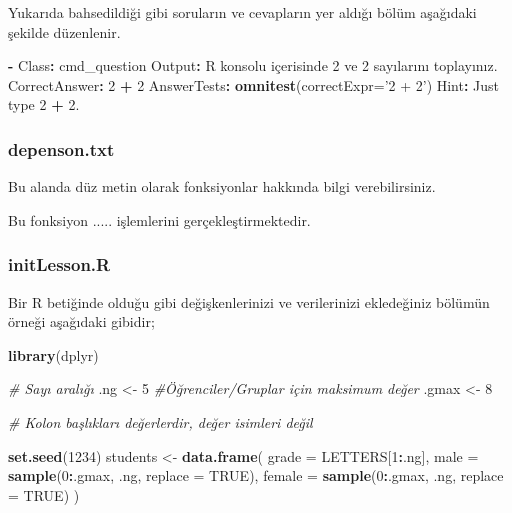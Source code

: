 \documentclass[]{book}
\newenvironment{Shaded}{\begin{snugshade}}{\end{snugshade}}
\newcommand{\KeywordTok}[1]{\textcolor[rgb]{0.13,0.29,0.53}{\textbf{#1}}}
\newcommand{\DataTypeTok}[1]{\textcolor[rgb]{0.13,0.29,0.53}{#1}}
\newcommand{\DecValTok}[1]{\textcolor[rgb]{0.00,0.00,0.81}{#1}}
\newcommand{\StringTok}[1]{\textcolor[rgb]{0.31,0.60,0.02}{#1}}
\newcommand{\CommentTok}[1]{\textcolor[rgb]{0.56,0.35,0.01}{\textit{#1}}}
\newcommand{\OtherTok}[1]{\textcolor[rgb]{0.56,0.35,0.01}{#1}}
\newcommand{\OperatorTok}[1]{\textcolor[rgb]{0.81,0.36,0.00}{\textbf{#1}}}
\newcommand{\NormalTok}[1]{#1}
\begin{document}
Yukarıda bahsedildiği gibi soruların ve cevapların yer aldığı bölüm
aşağıdaki şekilde düzenlenir.

\begin{Shaded}
\begin{Highlighting}[]
\OperatorTok{-}\StringTok{ }\NormalTok{Class}\OperatorTok{:}\StringTok{ }\NormalTok{cmd_question}
\NormalTok{  Output}\OperatorTok{:}\StringTok{ }\NormalTok{R konsolu içerisinde }\DecValTok{2}\NormalTok{ ve }\DecValTok{2}\NormalTok{ sayılarını toplayınız.}
\NormalTok{  CorrectAnswer}\OperatorTok{:}\StringTok{ }\DecValTok{2} \OperatorTok{+}\StringTok{ }\DecValTok{2}
\NormalTok{  AnswerTests}\OperatorTok{:}\StringTok{ }\KeywordTok{omnitest}\NormalTok{(}\DataTypeTok{correctExpr=}\StringTok{'2 + 2'}\NormalTok{)}
\NormalTok{  Hint}\OperatorTok{:}\StringTok{ }\NormalTok{Just type }\DecValTok{2} \OperatorTok{+}\StringTok{ }\DecValTok{2}\NormalTok{.}
\end{Highlighting}
\end{Shaded}

\subsubsection{depenson.txt}\label{depenson.txt}

Bu alanda düz metin olarak fonksiyonlar hakkında bilgi verebilirsiniz.

\begin{Shaded}
\begin{Highlighting}[]
\NormalTok{Bu fonksiyon ..... işlemlerini gerçekleştirmektedir.}
\end{Highlighting}
\end{Shaded}

\subsubsection{initLesson.R}\label{initlesson.r}

Bir R betiğinde olduğu gibi değişkenlerinizi ve verilerinizi ekledeğiniz
bölümün örneği aşağıdaki gibidir;

\begin{Shaded}
\begin{Highlighting}[]
\KeywordTok{library}\NormalTok{(dplyr)}

\CommentTok{# Sayı aralığı}
\NormalTok{.ng <-}\StringTok{ }\DecValTok{5}
\CommentTok{#Öğrenciler/Gruplar için maksimum değer}
\NormalTok{.gmax <-}\StringTok{ }\DecValTok{8}

\CommentTok{# Kolon başlıkları değerlerdir, değer isimleri değil}

\KeywordTok{set.seed}\NormalTok{(}\DecValTok{1234}\NormalTok{)}
\NormalTok{students <-}\StringTok{ }\KeywordTok{data.frame}\NormalTok{(}
  \DataTypeTok{grade =}\NormalTok{ LETTERS[}\DecValTok{1}\OperatorTok{:}\NormalTok{.ng],}
  \DataTypeTok{male =} \KeywordTok{sample}\NormalTok{(}\DecValTok{0}\OperatorTok{:}\NormalTok{.gmax, .ng, }\DataTypeTok{replace =} \OtherTok{TRUE}\NormalTok{),}
  \DataTypeTok{female =} \KeywordTok{sample}\NormalTok{(}\DecValTok{0}\OperatorTok{:}\NormalTok{.gmax, .ng, }\DataTypeTok{replace =} \OtherTok{TRUE}\NormalTok{)}
\NormalTok{)}
\end{Highlighting}
\end{Shaded}
\end{document}
